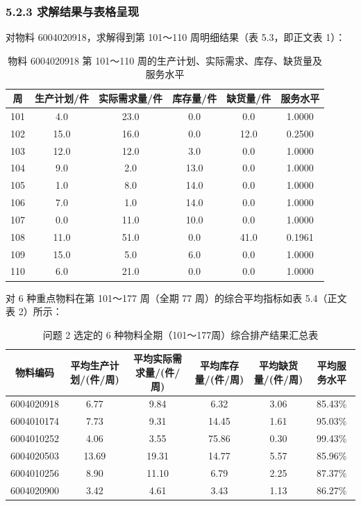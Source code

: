\subsubsection{5.2.3
求解结果与表格呈现}\label{ux6c42ux89e3ux7ed3ux679cux4e0eux8868ux683cux5448ux73b0}

对物料 6004020918，求解得到第 101～110 周明细结果（表 5.3，即正文表
1）：

\begin{table}[H]
\centering
\caption{物料 6004020918 第 101～110 周的生产计划、实际需求、库存、缺货量及服务水平}
\label{tab:q2_table1}
\begin{tabular}{cccccc}
\toprule
\textbf{周} & \textbf{生产计划/件} & \textbf{实际需求量/件} & \textbf{库存量/件} & \textbf{缺货量/件} & \textbf{服务水平} \\
\midrule
101 & 4.0 & 23.0 & 0.0 & 0.0 & 1.0000 \\
102 & 15.0 & 16.0 & 0.0 & 12.0 & 0.2500 \\
103 & 12.0 & 12.0 & 3.0 & 0.0 & 1.0000 \\
104 & 9.0 & 2.0 & 13.0 & 0.0 & 1.0000 \\
105 & 1.0 & 8.0 & 14.0 & 0.0 & 1.0000 \\
106 & 7.0 & 1.0 & 14.0 & 0.0 & 1.0000 \\
107 & 0.0 & 11.0 & 10.0 & 0.0 & 1.0000 \\
108 & 11.0 & 51.0 & 0.0 & 41.0 & 0.1961 \\
109 & 15.0 & 5.0 & 6.0 & 0.0 & 1.0000 \\
110 & 6.0 & 21.0 & 0.0 & 0.0 & 1.0000 \\
\bottomrule
\end{tabular}
\end{table}

对 6 种重点物料在第 101～177 周（全期 77 周）的综合平均指标如表
5.4（正文表 2）所示：

\begin{table}[H]
\centering
\caption{问题 2 选定的 6 种物料全期（101～177周）综合排产结果汇总表}
\label{tab:q2_table2}
\begin{tabular}{cccccc}
\toprule
\textbf{物料编码} & \textbf{平均生产计划/(件/周)} & \textbf{平均实际需求量/(件/周)} & \textbf{平均库存量/(件/周)} & \textbf{平均缺货量/(件/周)} & \textbf{平均服务水平} \\
\midrule
6004020918 & 6.77 & 9.84 & 6.32 & 3.06 & 85.43\% \\
6004010174 & 7.73 & 9.31 & 14.45 & 1.61 & 95.03\% \\
6004010252 & 4.06 & 3.55 & 75.86 & 0.30 & 99.43\% \\
6004020503 & 13.69 & 19.31 & 14.77 & 5.57 & 85.96\% \\
6004010256 & 8.90 & 11.10 & 6.79 & 2.25 & 87.37\% \\
6004020900 & 3.42 & 4.61 & 3.43 & 1.13 & 86.27\% \\
\bottomrule
\end{tabular}
\end{table}

